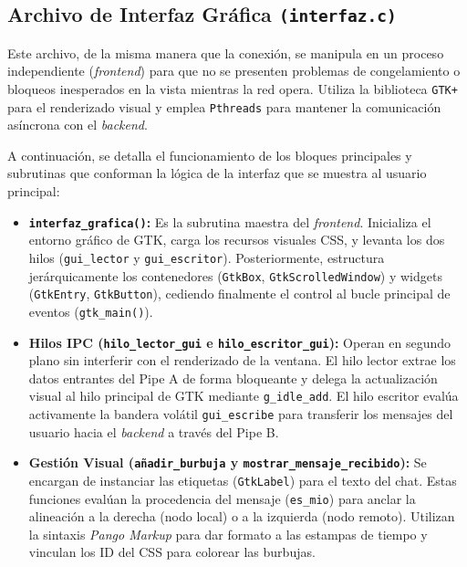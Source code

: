 \subsection{\large Archivo de Interfaz Gráfica \texttt{(interfaz.c)}}
Este archivo, de la misma manera que la conexión, se manipula en un proceso independiente (\textit{frontend}) para que no se presenten problemas de congelamiento o bloqueos inesperados en la vista mientras la red opera. Utiliza la biblioteca \texttt{GTK+} para el renderizado visual y emplea \texttt{Pthreads} para mantener la comunicación asíncrona con el \textit{backend}.

A continuación, se detalla el funcionamiento de los bloques principales y subrutinas que conforman la lógica de la interfaz que se muestra al usuario principal:

\begin{itemize}
    \item \textbf{\texttt{interfaz\_grafica()}:} Es la subrutina maestra del \textit{frontend}. Inicializa el entorno gráfico de GTK, carga los recursos visuales CSS, y levanta los dos hilos (\texttt{gui\_lector} y \texttt{gui\_escritor}). Posteriormente, estructura jerárquicamente los contenedores (\texttt{GtkBox}, \texttt{GtkScrolledWindow}) y widgets (\texttt{GtkEntry}, \texttt{GtkButton}), cediendo finalmente el control al bucle principal de eventos (\texttt{gtk\_main()}).
    
    \item \textbf{Hilos IPC (\texttt{hilo\_lector\_gui} e \texttt{hilo\_escritor\_gui}):} Operan en segundo plano sin interferir con el renderizado de la ventana. El hilo lector extrae los datos entrantes del Pipe A de forma bloqueante y delega la actualización visual al hilo principal de GTK mediante \texttt{g\_idle\_add}. El hilo escritor evalúa activamente la bandera volátil \texttt{gui\_escribe} para transferir los mensajes del usuario hacia el \textit{backend} a través del Pipe B.
    
    \item \textbf{Gestión Visual (\texttt{añadir\_burbuja} y \texttt{mostrar\_mensaje\_recibido}):} Se encargan de instanciar las etiquetas (\texttt{GtkLabel}) para el texto del chat. Estas funciones evalúan la procedencia del mensaje (\texttt{es\_mio}) para anclar la alineación a la derecha (nodo local) o a la izquierda (nodo remoto). Utilizan la sintaxis \textit{Pango Markup} para dar formato a las estampas de tiempo y vinculan los ID del CSS para colorear las burbujas.
    

\end{itemize}
